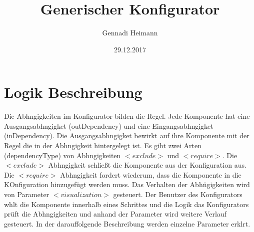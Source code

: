 \documentclass{article}
\begin{document}
\begin{titlepage}

\author{Gennadi Heimann} 
\title{Generischer Konfigurator} 
\date{29.12.2017} 
\maketitle
\end{titlepage}

\section{Logik Beschreibung}

Die Abhngigkeiten im Konfigurator bilden die Regel. Jede Komponente hat eine
Ausgangsabhngigket (outDependency) und eine Eingangsabhngigket
(inDependency). Die Ausgangsabhngigket bewirkt auf ihre Komponente mit der
Regel die in der Abhngigkeit hintergelegt ist. 
Es gibt zwei Arten (dependencyType) von Abhngigkeiten $<exclude>$ und
$<require>$. Die $<exclude>$ Abhngigkeit schlie\ss{}t die Komponente aus der
Konfiguration aus. Die $<require>$ Abhngigkeit fordert wiederum, dass die
Komponente in die KOnfiguration hinzugef\"ugt werden muss. Das Verhalten der
Abh\"ngigkeiten wird von Parameter $<visualization>$ gesteuert. Der Benutzer
des Konfigurators whlt die Komponente innerhalb eines Schrittes und die
Logik das Konfigurators pr\"uft die Abhngigkeiten und anhand der Parameter
wird weitere Verlauf gesteuert. In der darauffolgende Beschreibung werden
einzelne Parameter erklrt.
\end{document}
